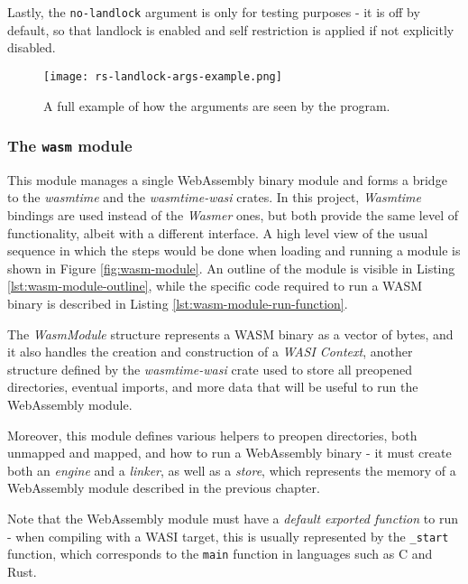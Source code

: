 Lastly, the \texttt{no-landlock} argument is only for testing purposes - it is off by default, so that
landlock is enabled and self restriction is applied if not explicitly disabled.

\vspace*{0.5cm}
\begin{figure}[ht]
  \centering
  \texttt{[image: rs-landlock-args-example.png]}
  \caption{A full example of how the arguments are seen by the program.}
  \label{fig:args-example}
\end{figure}

\subsubsection{The \texttt{wasm} module}
\label{sec:landlock-wasm-module}

This module manages a single WebAssembly binary module and forms a bridge to the \textit{wasmtime} and the \textit{wasmtime-wasi}
crates. In this project, \textit{Wasmtime} bindings are used instead of the \textit{Wasmer} ones, but both provide the
same level of functionality, albeit with a different interface. A high level view of the usual sequence in which the steps would be done
when loading and running a module is shown in Figure \ref{fig:wasm-module}. An outline of the module is visible
in Listing \ref{lst:wasm-module-outline}, while the specific code required to run a WASM binary is described
in Listing \ref{lst:wasm-module-run-function}.

The \textit{WasmModule} structure represents a WASM binary as a vector of bytes, and it also handles the creation
and construction of a \textit{WASI Context}, another structure defined by the \textit{wasmtime-wasi} crate used to store
all preopened directories, eventual imports, and more data that will be useful to run the WebAssembly module.

Moreover, this module defines various helpers to preopen directories, both unmapped and mapped, and
how to run a WebAssembly binary - it must create both an \textit{engine} and a \textit{linker},
as well as a \textit{store}, which represents the memory of a WebAssembly module described in the previous chapter.

Note that the WebAssembly module must have a \textit{default exported function} to run - when compiling with a WASI target,
this is usually represented by the \texttt{\_start} function, which corresponds to the \texttt{main} function in languages
such as C and Rust.

